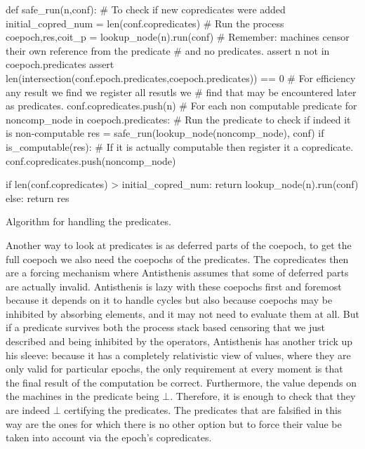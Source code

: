 \begin{code}
\begin{pycode}
def safe_run(n,conf):
    # To check if new copredicates were added
    initial_copred_num = len(conf.copredicates)
    # Run the process
    coepoch,res,coit_p = lookup_node(n).run(conf)
    # Remember: machines censor their own reference from the predicate
    # and no predicates.
    assert n not in coepoch.predicates
    assert len(intersection(conf.epoch.predicates,coepoch.predicates)) == 0
    # For efficiency any result we find we register all resutls we
    # find that may be encountered later as predicates.
    conf.copredicates.push(n)
    # For each non computable predicate
    for noncomp_node in coepoch.predicates:
        # Run the predicate to check if indeed it is non-computable
        res = safe_run(lookup_node(noncomp_node), conf)
        if is_computable(res):
            # If it is actually computable then register it a copredicate.
            conf.copredicates.push(noncomp_node)

    if len(conf.copredicates) > initial_copred_num:
        return lookup_node(n).run(conf)
    else:
        return res
\end{pycode}
\caption{\label{lst:algo_handle_prediates}Algorithm for handling the predicates.}
\end{code}

Another way to look at predicates is as deferred parts of the coepoch,
to get the full coepoch we also need the coepochs of the
predicates. The copredicates then are a forcing mechanism where
Antisthenis assumes that some of deferred parts are actually
invalid. Antisthenis is lazy with these coepochs first and foremost
because it depends on it to handle cycles but also because coepochs
may be inhibited by absorbing elements, and it may not need to
evaluate them at all. But if a predicate survives both the process
stack based censoring that we just described and being inhibited by
the operators, Antisthenis has another trick up his sleeve: because it
has a completely relativistic view of values, where they are only
valid for particular epochs, the only requirement at every moment is
that the final result of the computation be correct. Furthermore, the
value depends on the machines in the predicate being
\(\bot\). Therefore, it is enough to check that they are indeed
\(\bot\) certifying the predicates. The predicates that are falsified
in this way are the ones for which there is no other option but to
force their value be taken into account via the epoch's copredicates.


